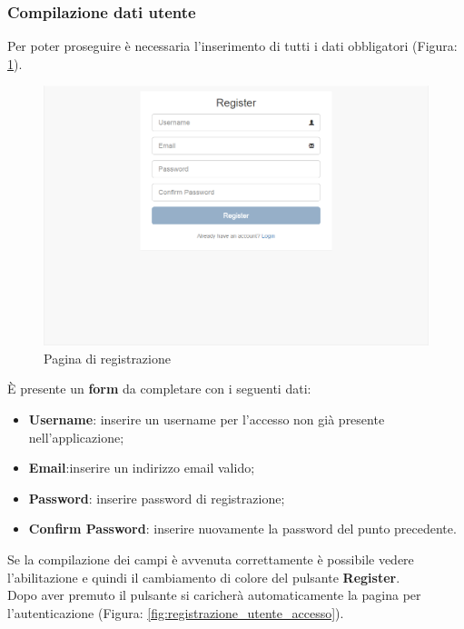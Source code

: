 		\pagebreak
		\subsubsection{Compilazione dati utente} %
		\label{sec:compilazioni_dati_utente}
			Per poter proseguire è necessaria l'inserimento di tutti i dati obbligatori (Figura: \ref{fig:pagina_di_registrazione}).
			\begin{figure}[H]
				\centering
				\centerline{\includegraphics[width=14cm]{images/registrazione_utente.png}}
				\caption{Pagina di registrazione}
				\label{fig:pagina_di_registrazione}
			\end{figure}
			È presente un \textbf{form} da completare con i seguenti dati:
			\begin{itemize}
				\item \textbf{Username}: inserire un username per l'accesso non già presente nell'applicazione;
				\item \textbf{Email}:inserire un indirizzo email valido;
				\item \textbf{Password}: inserire password di registrazione;
				\item \textbf{Confirm Password}: inserire nuovamente la password del punto precedente.
			\end{itemize}
			Se la compilazione dei campi è avvenuta correttamente è possibile vedere l'abilitazione e quindi il cambiamento di colore del pulsante \textbf{Register}.\\
			Dopo aver premuto il pulsante si caricherà automaticamente la pagina per l'autenticazione (Figura: \ref{fig:registrazione_utente_accesso}).

